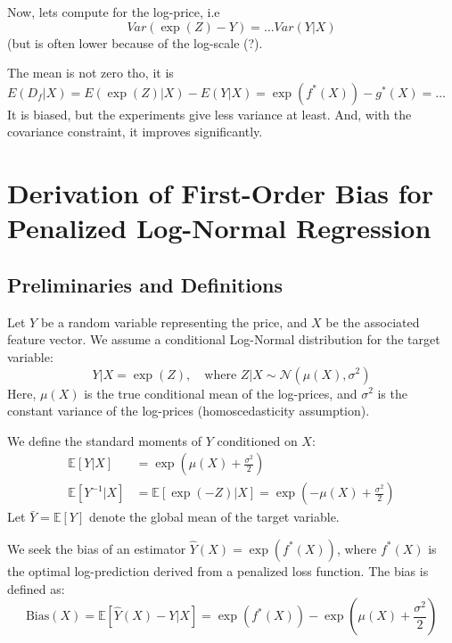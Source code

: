 \documentclass[11pt]{article}
\theoremstyle{plain}
\theoremstyle{definition}
\newcommand{\1}{\mathbf{1}}
\begin{document}


Now, lets compute for the log-price, i.e $$ Var(\exp{(Z)} - Y) = \ldots Var(Y|X)$$ (but is often lower because of the log-scale (?).

The mean is not zero tho, it is $E(D_f|X)=E(\exp(Z)|X)- E(Y|X)=\exp(f^*(X)) - g^*(X) = \ldots$
It is biased, but the experiments give less variance at least. And, with the covariance constraint, it improves significantly.

\newpage


\section{Derivation of First-Order Bias for Penalized Log-Normal Regression}

\subsection{Preliminaries and Definitions}

Let $Y$ be a random variable representing the price, and $X$ be the associated feature vector. We assume a conditional Log-Normal distribution for the target variable:
\begin{equation}
    Y | X = \exp(Z), \quad \text{where } Z | X \sim \mathcal{N}(\mu(X), \sigma^2)
\end{equation}
Here, $\mu(X)$ is the true conditional mean of the log-prices, and $\sigma^2$ is the constant variance of the log-prices (homoscedasticity assumption).

We define the standard moments of $Y$ conditioned on $X$:
\begin{align}
    \mathbb{E}[Y | X] &= \exp\left(\mu(X) + \frac{\sigma^2}{2}\right) \\
    \mathbb{E}[Y^{-1} | X] &= \mathbb{E}[\exp(-Z) | X] = \exp\left(-\mu(X) + \frac{\sigma^2}{2}\right)
\end{align}
Let $\bar{Y} = \mathbb{E}[Y]$ denote the global mean of the target variable.

We seek the bias of an estimator $\hat{Y}(X) = \exp(f^*(X))$, where $f^*(X)$ is the optimal log-prediction derived from a penalized loss function. The bias is defined as:
\begin{equation}
    \text{Bias}(X) = \mathbb{E}[\hat{Y}(X) - Y | X] = \exp(f^*(X)) - \exp\left(\mu(X) + \frac{\sigma^2}{2}\right)
\end{equation}
\end{document}
